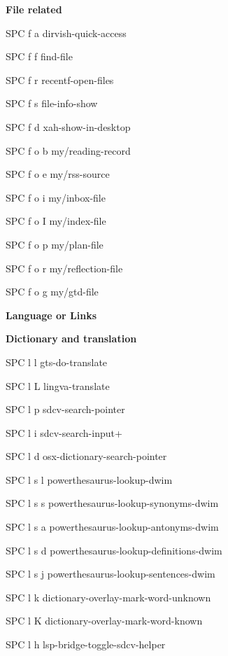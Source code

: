 \documentclass[10pt]{article}
\renewcommand\subsection[1]{\smallskip\par\textbf{\color{heading}#1}}
\renewcommand\subsubsection[1]{\smallskip\par\textbf{\color{heading}\small#1}}
\begin{document}
\begin{multicols}{4}
  \subsection{File related}
  \begin{keylist}
    \item[SPC f a] dirvish-quick-access
    \item[SPC f f] find-file
    \item[SPC f r] recentf-open-files
    \item[SPC f s] file-info-show
    \item[SPC f d] xah-show-in-desktop
    \item[SPC f o b] my/reading-record
    \item[SPC f o e] my/rss-source
    \item[SPC f o i] my/inbox-file
    \item[SPC f o I] my/index-file
    \item[SPC f o p] my/plan-file
    \item[SPC f o r] my/reflection-file
    \item[SPC f o g] my/gtd-file
  \end{keylist}


  \subsection{Language or Links}
  \subsubsection{Dictionary and translation}
  \begin{keylist}
    \item[SPC l l] gts-do-translate
    \item[SPC l L] lingva-translate
    \item[SPC l p] sdcv-search-pointer
    \item[SPC l i] sdcv-search-input+
    \item[SPC l d] osx-dictionary-search-pointer
    \item[SPC l s l] powerthesaurus-lookup-dwim
    \item[SPC l s s] powerthesaurus-lookup-synonyms-dwim
    \item[SPC l s a] powerthesaurus-lookup-antonyms-dwim
    \item[SPC l s d] powerthesaurus-lookup-definitions-dwim
    \item[SPC l s j] powerthesaurus-lookup-sentences-dwim
    \item[SPC l k] dictionary-overlay-mark-word-unknown
    \item[SPC l K] dictionary-overlay-mark-word-known
    \item[SPC l h] lsp-bridge-toggle-sdcv-helper
  \end{keylist}

\end{multicols}
\end{document}
